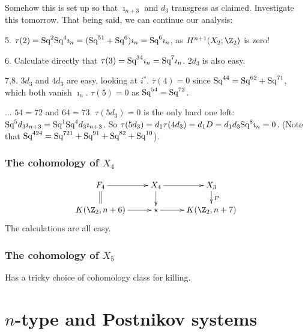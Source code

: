 \documentclass[11pt]{article}
\begin{document}
{Somehow this is set up so that $\imath_{n+3}$ and $d_3$ transgress as claimed.
Investigate this tomorrow. That being said, we can continue our analysis:
\begin{itemise}
\item[5.]$\tau(2)=\textup{Sq}^2\textup{Sq}^4\imath_n=(\textup{Sq}^{51}+\textup{Sq}^6)\imath_n=\textup{Sq}^6\imath_n$,
as $H^{n+1}(X_2;\Z_2)$ is zero!
\item[6.] %
Calculate directly that $\tau(3)=\textup{Sq}^{34}\imath_n=\textup{Sq}^7\imath_n$.
$2d_3$ is also easy.
\item[7,8.] $3d_3$ and $4d_3$ are easy, looking at $i^*$. $\tau(4)=0$ since
 $\textup{Sq}^{44}=\textup{Sq}^{62}+\textup{Sq}^{71}$, which both vanish 
$\imath_n$. $\tau(5)=0$ as $\textup{Sq}^{54}=\textup{Sq}^{72}$.
\item[...] $54=72$ and $64=73$. $\tau(5d_3)=0$ is the only hard one left:
$\textup{Sq}^5d_3\imath_{n+3}=\textup{Sq}^1\textup{Sq}^4d_3\imath_{n+3}$.
So $\tau(5d_3)=d_1\tau(4d_3)=d_1D=d_1d_3\textup{Sq}^8\imath_n=0$. 
(Note that $\textup{Sq}^{4 2 4} = \textup{Sq}^{7 2 1} + \textup{Sq}^{9 1} + \textup{Sq}^{8 2} + \textup{Sq}^{10}$).
\end{itemise}
\subsubsection{\texorpdfstring{The cohomology of $X_4$}{The cohomology of X4}}
\[\xymatrix@R=5mm{
F_4\ar[r]\ar@{=}[d]&
X_4\ar[d]\ar[r]&
X_{3}\ar[d]^{P}\\
K(\Z_2,n+6)\ar[r]&\star\ar[r]&K(\Z_2,n+7)
}\]
The calculations are all easy.
\subsubsection{\texorpdfstring{The cohomology of $X_5$}{The cohomology of X5}}
Has a tricky choice of cohomology class for killing.

} %

\section{\texorpdfstring{$n$}{n}-type and Postnikov systems}
\setcounter{subsection}{1}
\end{document}
